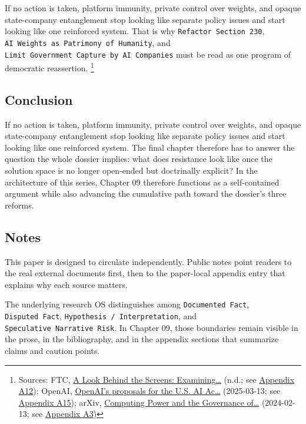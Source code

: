 \documentclass[
  american,
  11pt,
  letterpaper,
]{article}
\begin{document}
If no action is taken, platform immunity, private control over weights,
and opaque state-company entanglement stop looking like separate policy
issues and start looking like one reinforced system. That is why
\texttt{Refactor\ Section\ 230},
\texttt{AI\ Weights\ as\ Patrimony\ of\ Humanity}, and
\texttt{Limit\ Government\ Capture\ by\ AI\ Companies} must be read as
one program of democratic reassertion. \footnote{Sources: FTC,
  \href{https://www.ftc.gov/reports/look-behind-screens-examining-data-practices-social-media-video-streaming-services}{A
  Look Behind the Screens: Examining\ldots{}} (n.d.; see
  \hyperref[ch-09-appendix-a12-a-look-behind-the-screens-examining-the-data-practices-of-social-media-and-video-streaming-services]{Appendix
  A12}); OpenAI,
  \href{https://openai.com/global-affairs/openai-proposals-for-the-us-ai-action-plan/}{OpenAI's
  proposals for the U.S. AI Ac\ldots{}} (2025-03-13; see
  \hyperref[ch-09-appendix-a15-openais-proposals-for-the-us-ai-action-plan]{Appendix
  A15}); arXiv, \href{https://arxiv.org/abs/2402.08797}{Computing Power
  and the Governance of\ldots{}} (2024-02-13; see
  \hyperref[ch-09-appendix-a3-computing-power-and-the-governance-of-artificial-intelligence]{Appendix
  A3})}

\subsection{Conclusion}\label{conclusion-9}

If no action is taken, platform immunity, private control over weights,
and opaque state-company entanglement stop looking like separate policy
issues and start looking like one reinforced system. The final chapter
therefore has to answer the question the whole dossier implies: what
does resistance look like once the solution space is no longer
open-ended but doctrinally explicit? In the architecture of this series,
Chapter 09 therefore functions as a self-contained argument while also
advancing the cumulative path toward the dossier's three reforms.

\subsection{Notes}\label{notes-9}

This paper is designed to circulate independently. Public notes point
readers to the real external documents first, then to the paper-local
appendix entry that explains why each source matters.

The underlying research OS distinguishes among
\texttt{Documented\ Fact}, \texttt{Disputed\ Fact},
\texttt{Hypothesis\ /\ Interpretation}, and
\texttt{Speculative\ Narrative\ Risk}. In Chapter 09, those boundaries
remain visible in the prose, in the bibliography, and in the appendix
sections that summarize claims and caution points.
\end{document}
